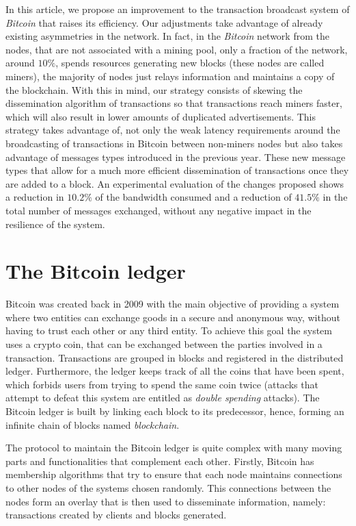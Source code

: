 \documentclass{dads}   %
\begin{document}
In this article, we propose an improvement to the transaction broadcast system of \textit{Bitcoin} that raises its efficiency. Our adjustments take advantage of already existing asymmetries in the network. In fact, in the \textit{Bitcoin} network from the nodes, that are not associated with a mining pool, only a fraction of the network, around $10\%$, spends resources generating new blocks (these nodes are called miners), the majority of nodes just relays information and maintains a copy of the blockchain. With this in mind, our strategy consists of skewing the dissemination algorithm of transactions so that transactions reach miners faster, which will also result in lower amounts of duplicated advertisements. This strategy takes advantage of, not only the weak latency requirements around the broadcasting of transactions in Bitcoin between non-miners nodes but also takes advantage of messages types introduced in the previous year. These new message types that allow for a much more efficient dissemination of transactions once they are added to a block. An experimental evaluation of the changes proposed shows a reduction in $10.2\%$ of the bandwidth consumed and a reduction of $41.5\%$ in the total number of messages exchanged, without any negative impact in the resilience of the system.

\section{The {\secit Bitcoin} ledger}
Bitcoin was created back in 2009 with the main objective of providing a system where two entities can exchange goods in a secure and anonymous way, without having to trust each other or any third entity. To achieve this goal the system uses a crypto coin, that can be exchanged between the parties involved in a transaction. Transactions are grouped in blocks and registered in the distributed ledger. Furthermore, the ledger keeps track of all the coins that have been spent, which forbids users from trying to spend the same coin twice (attacks that attempt to defeat this system are entitled as \textit{double spending} attacks). The Bitcoin ledger is built by linking each block to its predecessor, hence, forming an infinite chain of blocks named \textit{blockchain}.

The protocol to maintain the Bitcoin ledger is quite complex with many moving parts and functionalities that complement each other. Firstly, Bitcoin has membership algorithms that try to ensure that each node maintains connections to other nodes of the systems chosen randomly. This connections between the nodes form an overlay that is then used to disseminate information, namely: transactions created by clients and blocks generated.
\end{document}
